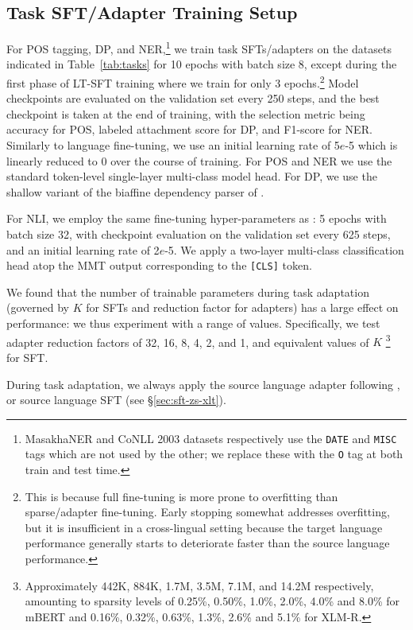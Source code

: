 \subsection{Task SFT/Adapter Training Setup} For POS tagging, DP, and NER,\footnote{MasakhaNER and CoNLL 2003 datasets respectively use the \texttt{DATE} and \texttt{MISC} tags which are not used by the other; we replace these with the \texttt{O} tag at both train and test time.} we train task SFTs/adapters on the datasets indicated in Table~\ref{tab:tasks} for 10 epochs with batch size 8, except during the first phase of LT-SFT training where we train for only 3 epochs.\footnote{This is because full fine-tuning is more prone to overfitting than sparse/adapter fine-tuning. Early stopping somewhat addresses overfitting, but it is insufficient in a cross-lingual setting because the target language performance generally starts to deteriorate faster than the source language performance.} Model checkpoints are evaluated on the validation set every 250 steps, and the best checkpoint is taken at the end of training, with the selection metric being accuracy for POS, labeled attachment score for DP, and F1-score for NER. Similarly to language fine-tuning, we use an initial learning rate of 5$e$-5 which is linearly reduced to 0 over the course of training.  For POS and NER we use the standard token-level single-layer multi-class model head. For DP, we use the shallow variant \citep{glavas-vulic-2021-supervised} of the biaffine dependency parser of \citet{dozat-manning-2017-deep}. 

For NLI, we employ the same fine-tuning hyper-parameters as \citet{ebrahimi-etal-2021-americasnli}: 5 epochs with batch size 32, with checkpoint evaluation on the validation set every 625 steps, and an initial learning rate of 2$e$-5. We apply a two-layer multi-class classification head atop the MMT output corresponding to the \texttt{[CLS]} token.

We found that the number of trainable parameters during task adaptation (governed by $K$ for SFTs and reduction factor for adapters) has a large effect on performance: we thus experiment with a range of values. Specifically, we test adapter reduction factors of 32, 16, 8, 4, 2, and 1, and equivalent values of $K$ \footnote{Approximately 442K, 884K, 1.7M, 3.5M, 7.1M, and 14.2M respectively, amounting to sparsity levels of 0.25\%, 0.50\%, 1.0\%, 2.0\%, 4.0\% and 8.0\% for mBERT and 0.16\%, 0.32\%, 0.63\%, 1.3\%, 2.6\% and 5.1\% for XLM-R.} for SFT.

During task adaptation, we always apply the source language adapter following \citet{pfeiffer-etal-2020-mad}, or source language SFT (see \S\ref{sec:sft-zs-xlt}).

